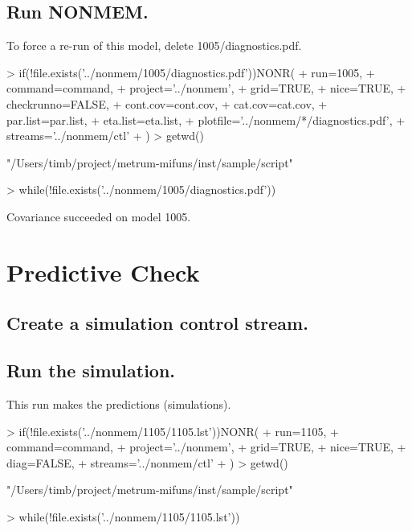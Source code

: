 \subsection{Run NONMEM.}
To force a re-run of this model, delete 1005/diagnostics.pdf.
\begin{Schunk}
\begin{Sinput}
> if(!file.exists('../nonmem/1005/diagnostics.pdf'))NONR(
+      run=1005,
+      command=command,
+      project='../nonmem',
+      grid=TRUE,
+      nice=TRUE,
+      checkrunno=FALSE,
+      cont.cov=cont.cov,
+      cat.cov=cat.cov,
+      par.list=par.list,
+      eta.list=eta.list,
+      plotfile='../nonmem/*/diagnostics.pdf',
+      streams='../nonmem/ctl'
+ )
> getwd()
\end{Sinput}
\begin{Soutput}
[1] "/Users/timb/project/metrum-mifuns/inst/sample/script"
\end{Soutput}
\begin{Sinput}
> while(!file.exists('../nonmem/1005/diagnostics.pdf')){}
\end{Sinput}
\end{Schunk}
Covariance succeeded on model 1005.
\section{Predictive Check}
\subsection{Create a simulation control stream.}
\begin{Schunk}
\end{Schunk}
\subsection{Run the simulation.}
This run makes the predictions (simulations).
\begin{Schunk}
\begin{Sinput}
> if(!file.exists('../nonmem/1105/1105.lst'))NONR(
+      run=1105,
+      command=command,
+      project='../nonmem',
+      grid=TRUE,
+      nice=TRUE,
+      diag=FALSE,
+      streams='../nonmem/ctl'
+ )
> getwd()
\end{Sinput}
\begin{Soutput}
[1] "/Users/timb/project/metrum-mifuns/inst/sample/script"
\end{Soutput}
\begin{Sinput}
> while(!file.exists('../nonmem/1105/1105.lst')){}
\end{Sinput}
\end{Schunk}

